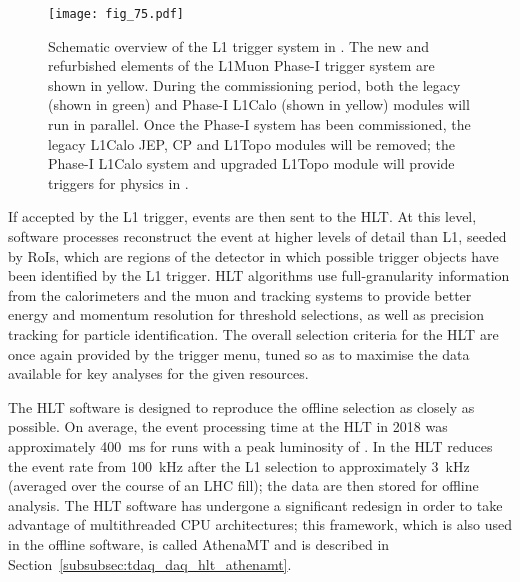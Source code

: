 \documentclass[cernpreprint, atlasdraft=false, UKenglish,british,orcidlogo, texmf, orcidlogo]{atlasdoc}
\begin{document}
\begin{figure}[htbp]
\centerline{\texttt{[image: fig\_75.pdf]}}
\caption{Schematic overview of the \gls{L1} trigger system in \RunThr.  The new and refurbished elements of the \gls{L1Muon} Phase-I trigger system are shown in yellow.  During the commissioning period, both the legacy (shown in green) and Phase-I \gls{L1Calo} (shown in yellow) modules will run in parallel.  Once the Phase-I system has been commissioned, the legacy \gls{L1Calo} \gls{JEP}, \gls{CP} and \gls{L1Topo} modules will be removed; the Phase-I \gls{L1Calo} system and upgraded \gls{L1Topo} module will provide triggers for physics in \RunThr.}
\label{fig:TDAQ_L1Overview}
\end{figure}
 
 
 
 
 
If accepted by the \gls{L1} trigger, events are then sent to the \gls{HLT}. At this level, software processes reconstruct the event at higher levels of detail than \gls{L1}, seeded by \glspl{RoI}, which are regions of the detector in which possible trigger objects have been identified by the \gls{L1} trigger.
\gls{HLT} algorithms use full-granularity information from the calorimeters and the muon and tracking systems to provide better energy and momentum resolution for threshold selections, as well as precision tracking for particle identification. The overall selection criteria for the \gls{HLT} are once again provided by the trigger menu, tuned so as to maximise the data available for key analyses for the given resources.
 
The \gls{HLT} software is designed to reproduce the offline selection as closely as possible. On average, the event processing time at the \gls{HLT} in 2018 was approximately \SI{400}{\ms} for runs with a peak luminosity of \lumiruntwopeak. In \RunThr the \gls{HLT} reduces the event rate from \SI{100}{\kHz} after the \gls{L1} selection to approximately \SI{3}{\kHz} (averaged over the course of an \gls{LHC} fill); the data are then stored for offline analysis.
The \gls{HLT} software has undergone a significant redesign in order to take advantage of multithreaded \gls{CPU} architectures; this framework, which is also used in the offline software, is called \gls{AthenaMT} and is described in Section~\ref{subsubsec:tdaq_daq_hlt_athenamt}.
 
\end{document}
